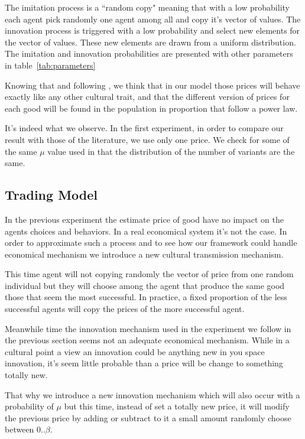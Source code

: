 \documentclass{wscpaperproc}
\begin{document}
The imitation process is a ``random copy" meaning that with a low probability each agent pick randomly one agent among all and copy it's vector of values. The innovation process is triggered with a low probability and select new elements for the vector of values. These new elements are drawn from a uniform distribution. The imitation and innovation probabilities are presented with other parameters in table~\ref{tab:parameters}

Knowing that and following \cite{bentley_random_2004,bentley_specialisation_2005,mesoudi_random_2009}, we think that in our model those prices will behave exactly like any other cultural trait, and that the different version of prices for each good will be found in the population in proportion that follow a power law.

It's indeed what we observe. In the first experiment, in order to compare our result with those of the literature, we use only one price. We check for some of the same $\mu$ value used in \cite{bentley_specialisation_2005,mesoudi_random_2009} that the distribution of the number of variants are the same. 

\subsection{Trading Model}\label{sec:trade}
In the previous experiment the estimate price of good have no impact on the agents choices and behaviors. In a real economical system it's not the case. In order to approximate such a process and to see how our framework could handle economical mechanism we introduce a new cultural transmission mechanism. 

This time agent will not copying randomly the vector of price from one random individual but they will choose among the agent that produce the same good those that seem the most successful. In practice, a fixed proportion of the less successful agents will copy the prices of the more successful agent. 


Meanwhile time the innovation mechanism used in the experiment  we follow in the previous section seems not  an adequate economical mechanism. While in a cultural point a view an innovation could be anything new in you space innovation, it's seem little probable than a price will be change to something totally new. 

That why we  introduce a new innovation mechanism which will also occur with a probability of $\mu$ but this time, instead of set a totally new price, it will modify the previous price by adding or subtract to it a small amount randomly choose between $0 .. \beta$.
\end{document}
